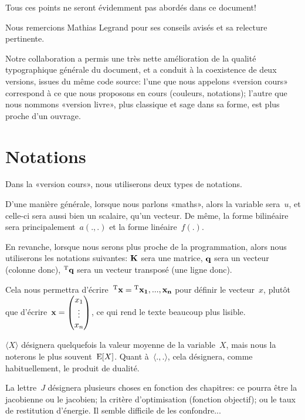\documentclass[11pt,pdflatex]{book}
\begin{document}
\medskip
Tous ces points ne seront évidemment pas abordés dans ce document!
\vfill
\noindent
{}

Nous remercions Mathias Legrand pour ses conseils avisés et sa relecture pertinente.

Notre collaboration a permis une très nette amélioration de la qualité typographique générale du document, et a conduit à la coexistence de deux versions, issues du même code source: l'une que nous appelons «version cours» correspond à ce que nous proposons en cours (couleurs, notations); l'autre que nous nommons «version livre», plus classique et sage dans sa forme, est plus proche d'un ouvrage.

\ifVersionDuDocEstVincent
\newpage
\section*{Notations}

Dans la «version cours», nous utiliserons deux types de notations.

\medskip
D'une manière générale, lorsque nous parlons «maths», alors la variable sera~$u$, et celle-ci sera aussi bien un scalaire, qu'un vecteur. De même, la forme bilinéaire sera principalement~$a(.,.)$ et la forme linéaire~$f(.)$.

\medskip
En revanche, lorsque nous serons plus proche de la programmation, alors nous utiliserons les notations suivantes:
$\MM{K}$ sera une matrice, $\VV{q}$ sera un vecteur (colonne donc), ${}^\mathrm{T}\mathbf{q}$ sera un vecteur transposé (une ligne donc).

Cela nous permettra d'écrire~${}^\mathrm{T}\mathbf{x}={}^\mathrm{T}\mathbf{x_1, ..., x_n}$ pour définir le vecteur~$x$, plutôt que d'écrire~$\VV{x}=\VV*{x_1\\ \vdots\\x_n}$, ce qui rend le texte beaucoup plus lisible. 

\medskip
$\langle X\rangle$ désignera quelquefois la valeur moyenne de la variable~$X$, mais nous la noterons le plus souvent~$\operatorname{E}[X]$.
Quant à~$\langle.,.\rangle$, cela désignera, comme habituellement, le produit de dualité.

\medskip
La lettre~$J$ désignera plusieurs choses en fonction des chapitres: ce pourra être la jacobienne ou le jacobien; la critère d'optimisation (fonction objectif); ou le taux de restitution d'énergie. Il semble difficile de les confondre...
\end{document}
